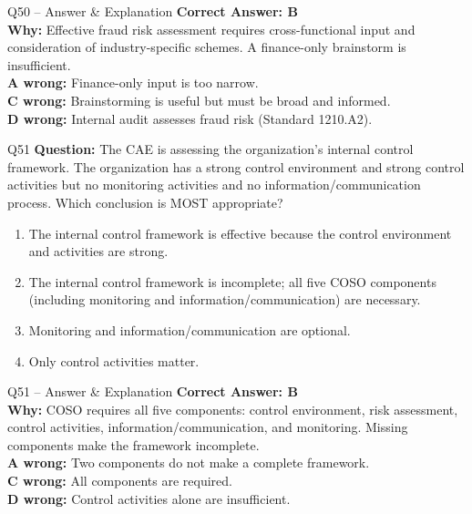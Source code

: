 \documentclass[aspectratio=169,10pt]{beamer}
\begin{document}
	\begin{frame}[t]{Q50 -- Answer \& Explanation}
		\small
		\textbf{Correct Answer: B} \\[4pt]
		\textbf{Why:} Effective fraud risk assessment requires cross-functional input and consideration of industry-specific schemes. A finance-only brainstorm is insufficient. \\[4pt]
		\textbf{A wrong:} Finance-only input is too narrow. \\[2pt]
		\textbf{C wrong:} Brainstorming is useful but must be broad and informed. \\[2pt]
		\textbf{D wrong:} Internal audit assesses fraud risk (Standard 1210.A2).
	\end{frame}
	
	\begin{frame}[t]{Q51}
		\small
		\textbf{Question:} The CAE is assessing the organization's internal control framework. The organization has a strong control environment and strong control activities but no monitoring activities and no information/communication process. Which conclusion is MOST appropriate?
		\begin{enumerate}[label=\Alph*.,itemsep=1pt,topsep=2pt]
			\item The internal control framework is effective because the control environment and activities are strong.
			\item The internal control framework is incomplete; all five COSO components (including monitoring and information/communication) are necessary.
			\item Monitoring and information/communication are optional.
			\item Only control activities matter.
		\end{enumerate}
	\end{frame}
	
	\begin{frame}[t]{Q51 -- Answer \& Explanation}
		\small
		\textbf{Correct Answer: B} \\[4pt]
		\textbf{Why:} COSO requires all five components: control environment, risk assessment, control activities, information/communication, and monitoring. Missing components make the framework incomplete. \\[4pt]
		\textbf{A wrong:} Two components do not make a complete framework. \\[2pt]
		\textbf{C wrong:} All components are required. \\[2pt]
		\textbf{D wrong:} Control activities alone are insufficient.
	\end{frame}
	
\end{document}

